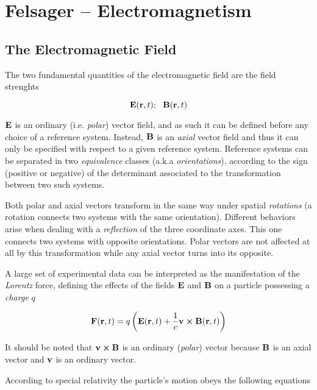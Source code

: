 \chapter{Felsager -- Electromagnetism}
\label{felsager_01} 

\section{The Electromagnetic Field}

The two fundamental quantities of the electromagnetic field are the field strenghts

\begin{equation*}
\vb{E}(\vb{r}, t); \:\:\: \vb{B}(\vb{r}, t)
\end{equation*}

$\vb{E}$ is an ordinary (i.e. \textit{polar}) vector field, and as such it can be defined before any choice of a reference system. Instead, $\vb{B}$ is an \textit{axial} vector field and thus it can only be specified with respect to a given reference system. Reference systems can be separated in two \textit{equivalence} classes (a.k.a \textit{orientations}), according to the sign (positive or negative) of the determinant associated to the transformation between two such systems. 

Both polar and axial vectors transform in the same way under spatial \textit{rotations} (a rotation connects two systems with the same orientation). Different behaviors arise when dealing with a \textit{reflection} of the three coordinate axes. This one connects two systems with opposite orientations. Polar vectors are not affected at all by this transformation while any axial vector turns into its opposite.

A large set of experimental data can be interpreted as the manifestation of the \textit{Lorentz} force, defining the effects of the fields $\vb{E}$ and $\vb{B}$ on a particle possessing a \textit{charge} $q$

\begin{equation}
\vb{F}(\vb{r}, t) = q \left(\vb{E}(\vb{r}, t) + \frac{1}{c} \vb{v} \cross \vb{B}(\vb{r}, t) \right)
\label{eq:Lorentzforce1}
\end{equation}

It should be noted that $\vb{v} \cross \vb{B}$ is an ordinary (\textit{polar}) vector because $\vb{B}$ is an axial vector and $\vb{v}$ is an ordinary vector. 

According to special relativity the particle's motion obeys the following equations 

